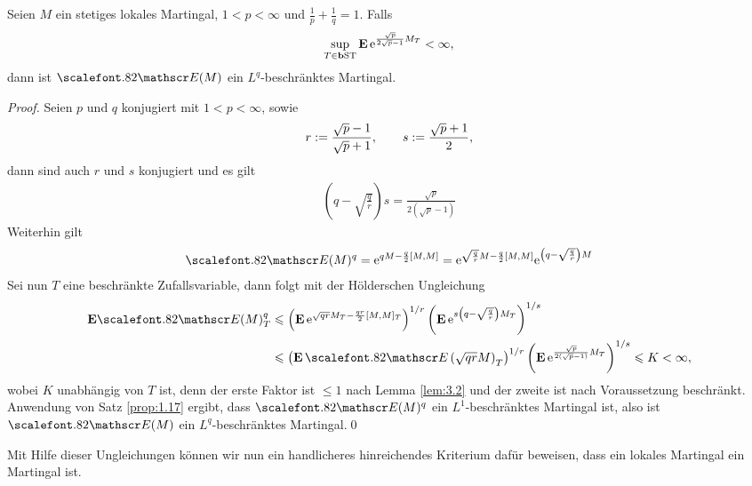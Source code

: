 \begin{lemma}
\label{lem:3.3}
Seien $M$ ein stetiges lokales Martingal, $1 < p < \infty$ und
$\frac{1}{p} + \frac{1}{q} = 1$.  Falls
\begin{align*}
\sup\limits_{T\in\mathbf{b}\mathrm{ST}} \mathbf{E}\, \mathrm{e}^{\frac{\sqrt{p}}{2\sqrt{p}-1} M_T} < \infty, 
\end{align*}
dann ist $\Ep(M)$ ein $L^q$-beschränktes Martingal.\fish
\end{lemma}
\begin{proof}
Seien $p$ und $q$ konjugiert mit $1 < p <\infty$, sowie
\begin{align*}
r := \frac{\sqrt{p}-1}{\sqrt{p}+1},\qquad
s := \frac{\sqrt{p}+1}{2},
\end{align*}
dann sind auch $r$ und $s$ konjugiert und es gilt
\begin{align*}
\left(q - \sqrt{\frac{q}{r}} \right)s = \frac{\sqrt{p}}{2(\sqrt{p}-1)}
\end{align*}
Weiterhin gilt
\begin{align*}
\Ep(M)^q = \e^{qM-\frac{q}{2}[M,M]} = 
\e^{\sqrt{\frac{q}{r}}M - \frac{q}{2}[M,M]}
\e^{\left(q-\sqrt{\frac{q}{r}}\right)M}
\end{align*}
Sei nun $T$ eine beschränkte Zufallsvariable, dann folgt mit der Hölderschen
Ungleichung
\begin{align*}
\E \Ep(M)_T^q &\le 
\left(\E\, \e^{\sqrt{qr}M_T - \frac{qr}{2}[M,M]_T}\right)^{1/r}
\left(\E\, \e^{s\left(q-\sqrt{\frac{q}{r}}\right)M_T}\right)^{1/s}\\
&\le 
\left(\E\, \Ep\left(\sqrt{qr}M\right)_T\right)^{1/r}
\left(\E\, \e^{\frac{\sqrt{p}}{2(\sqrt{p}-1)}M_T}\right)^{1/s} \le K< \infty,
\end{align*}
wobei $K$ unabhängig von $T$ ist, denn der erste Faktor ist $\le 1$ nach Lemma
\ref{lem:3.2} und der zweite ist nach Voraussetzung beschränkt. Anwendung von
Satz \ref{prop:1.17} ergibt, dass $\Ep(M)^q$ ein $L^1$-beschränktes Martingal
ist, also ist $\Ep(M)$ ein $L^q$-beschränktes Martingal.\qed
\end{proof}

Mit Hilfe dieser Ungleichungen können wir nun ein handlicheres hinreichendes
Kriterium dafür beweisen, dass ein lokales Martingal ein Martingal ist.

